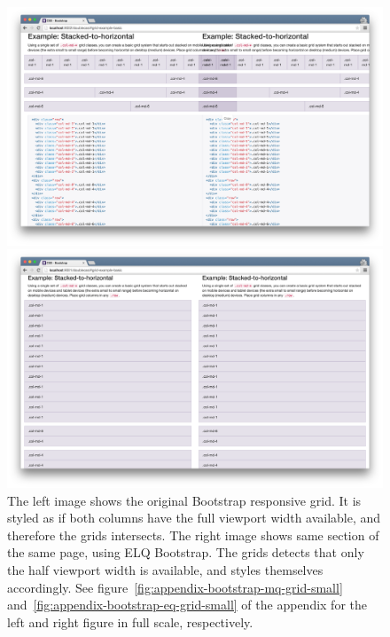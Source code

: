 \documentclass[a4paper,11pt]{kth-mag}
\begin{document}
      \begin{figure}[htb!]
        \centering
        \begin{minipage}{.5\textwidth}
          \centering
          \includegraphics[width=\linewidth]{images/bootstrap-mq-grid}
        \end{minipage}%
        \begin{minipage}{.5\textwidth}
          \centering
          \includegraphics[width=\linewidth]{images/bootstrap-eq-grid}
        \end{minipage}
        \caption{
          The left image shows the original \gls{Bootstrap} \gls{responsive} grid.
          It is styled as if both columns have the full \gls{viewport} width available, and therefore the grids intersects.
          The right image shows same section of the same page, using \gls{ELQ} \gls{Bootstrap}.
          The grids detects that only the half \gls{viewport} width is available, and styles themselves accordingly.
          See figure~\ref{fig:appendix-bootstrap-mq-grid-small} and~\ref{fig:appendix-bootstrap-eq-grid-small} of the appendix for the left and right figure in full scale, respectively.
        }
        \label{fig:eval-bootstrap-mq-eq-grid}
      \end{figure}
\end{document}
